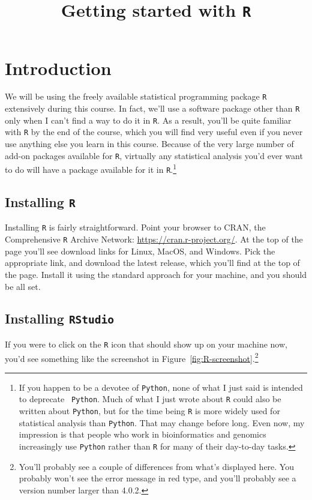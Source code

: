 \documentclass[12pt]{article}
\title{Getting started with {\tt R}}
\begin{document}
\maketitle

\tableofcontents

\section{Introduction}

We will be using the freely available statistical programming package
{\tt R}  extensively during this course. In fact, we'll use a software
package other than {\tt R} only when I can't find a way to do it in
{\tt R}. As a result, you'll be quite familiar with {\tt R} by the end
of the course, which you will find very useful even if you never use
anything else you learn in this course. Because of the very large
number of add-on packages available for {\tt R}, virtually any
statistical analysis you'd ever want to do will have a package
available for it in {\tt R}.\footnote{If you happen to be a devotee of
  {\tt Python}, none of what I just said is intended to deprecate {\tt
    Python}. Much of what I just wrote about {\tt R} could also be
  written about {\tt Python}, but for the time being {\tt R} is more
  widely used for statistical analysis than {\tt Python}. That may
  change before long. Even now, my impression is that people who work
  in bioinformatics and genomics increasingly use {\tt Python} rather
  than {\tt R} for many of their day-to-day tasks.}

\subsection{Installing {\tt R}}

Installing {\tt R} is fairly straightforward. Point your browser to
CRAN, the Comprehensive {\tt R} Archive Network:
\url{https://cran.r-project.org/}. At the top of the page you'll see
download links for Linux, MacOS, and Windows. Pick the appropriate
link, and download the latest release, which you'll find at the top of
the page. Install it using the standard approach for your machine, and
you should be all set.

\subsection{Installing {\tt RStudio}}

If you were to click on the {\tt R} icon that should show up on your
machine now, you'd see something like the screenshot in
Figure~\ref{fig:R-screenshot}.\footnote{You'll probably see a couple
  of differences from what's displayed here. You probably won't see
  the error message in red type, and you'll probably see a version
  number larger than 4.0.2.}
\end{document}
